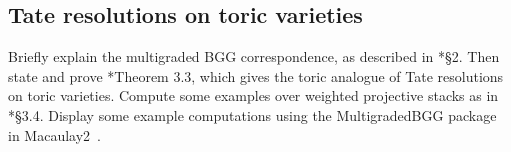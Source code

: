 \documentclass[11pt]{amsart}
\numberwithin{equation}{section}
\theoremstyle{definition}
\theoremstyle{remark}
\begin{document}
\subsection{Tate resolutions on toric varieties}
Briefly explain the multigraded BGG correspondence, as described in \cite{BETate}*{\S 2}. Then state and prove \cite{BETate}*{Theorem 3.3}, which gives the toric analogue of Tate resolutions on toric varieties. Compute some examples over weighted projective stacks as in \cite{BETate}*{\S 3.4}. Display some example computations using the MultigradedBGG package in Macaulay2~\cite{BBGSTZ}. 

\medskip





\end{document}
